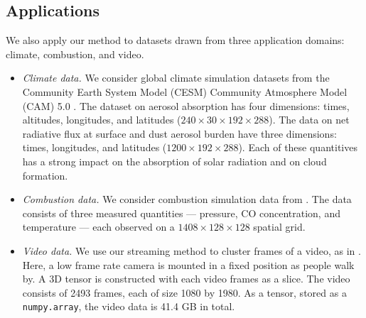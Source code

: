 \subsection{Applications}\label{s-real-data}

We also apply our method to datasets drawn from three application domains:
climate, combustion, and video.
\begin{itemize}
\item \emph{Climate data.}
We consider global climate simulation datasets from
the Community Earth System Model (CESM) Community Atmosphere Model (CAM) 5.0 \cite{hurrell2013community,kay2015community}.
The dataset on aerosol absorption has four dimensions:
times, altitudes, longitudes, and latitudes  ($240 \times 30 \times 192 \times 288$).
The data on net radiative flux at surface and dust aerosol burden have three dimensions:
times, longitudes, and latitudes ($1200 \times 192 \times 288$).
Each of these quantitives has a strong impact on the absorption of solar radiation and on cloud formation.

\item \emph{Combustion data.}
We consider combustion simulation data from \cite{lapointe2015differential}.
The data consists of three measured quantities ---
pressure, CO concentration, and temperature ---
each observed on a $1408 \times 128 \times 128$ spatial grid.

\item \emph{Video data.}
We use our streaming method to cluster frames of a video,
as in \cite{malik2018low}.
Here, a low frame rate camera is mounted in a fixed position as people walk by.
A 3D tensor is constructed with each video frames as a slice.
The video consists of 2493 frames, each of size 1080 by 1980.
As a tensor, stored as a \texttt{numpy.array}, the video data is 41.4 GB in total.
\end{itemize}

